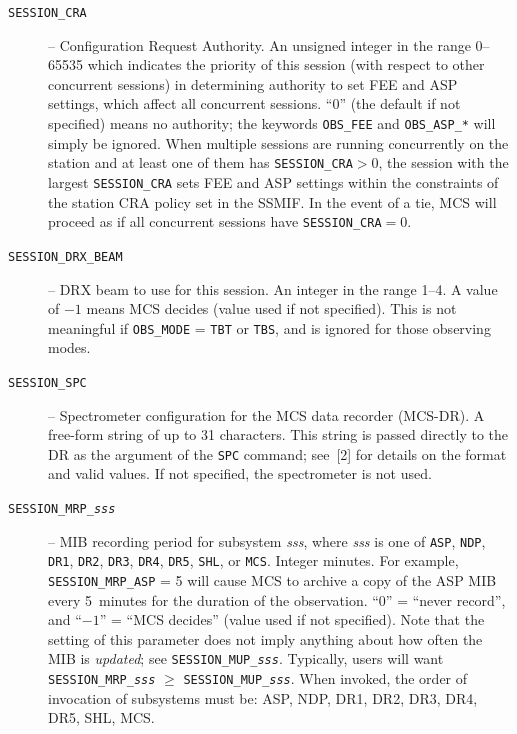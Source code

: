 \begin{description}
\item[\texttt{SESSION\_CRA}] -- Configuration Request Authority.  An unsigned integer in the range 0--65535 which indicates the priority of this session (with respect to other concurrent sessions) in determining authority to set FEE and ASP settings, which affect all concurrent sessions.  ``0'' (the default if not specified) means no authority; the keywords \texttt{OBS\_FEE} and \texttt{OBS\_ASP\_*} will simply be ignored.  When multiple sessions are running concurrently on the station and at least one of them has \texttt{SESSION\_CRA}$> 0$, the session with the largest \texttt{SESSION\_CRA} sets FEE and ASP settings within the constraints of the station CRA policy set in the SSMIF.  In the event of a tie, MCS will proceed as if all concurrent sessions have \texttt{SESSION\_CRA}$= 0$.

\item[\texttt{SESSION\_DRX\_BEAM}] -- DRX beam to use for this session.  An integer in the range 1--4.  A value of $-1$ means MCS decides (value used if not specified).  This is not meaningful if \texttt{OBS\_MODE} = \texttt{TBT} or \texttt{TBS}, and is ignored for those observing modes.

\item[\texttt{SESSION\_SPC}] -- Spectrometer configuration for the MCS data recorder (MCS-DR).  A free-form string of up to 31 characters.  This string is passed directly to the DR as the argument of the \texttt{SPC} command; see~[2] for details on the format and valid values.  If not specified, the spectrometer is not used.

\item[\texttt{SESSION\_MRP\_\textit{sss}}] -- MIB recording period for subsystem \textit{sss}, where \textit{sss} is one of \texttt{ASP}, \texttt{NDP}, \texttt{DR1}, \texttt{DR2}, \texttt{DR3}, \texttt{DR4}, \texttt{DR5}, \texttt{SHL}, or \texttt{MCS}.  Integer minutes.  For example, \texttt{SESSION\_MRP\_ASP} = 5 will cause MCS to archive a copy of the ASP MIB every 5~minutes for the duration of the observation.  ``0'' = ``never record'', and ``$-1$'' = ``MCS decides'' (value used if not specified).  Note that the setting of this parameter does not imply anything about how often the MIB is \textit{updated}; see \texttt{SESSION\_MUP\_\textit{sss}}.  Typically, users will want \texttt{SESSION\_MRP\_\textit{sss}} $\ge$ \texttt{SESSION\_MUP\_\textit{sss}}.  When invoked, the order of invocation of subsystems must be: ASP, NDP, DR1, DR2, DR3, DR4, DR5, SHL, MCS.


\end{description}
